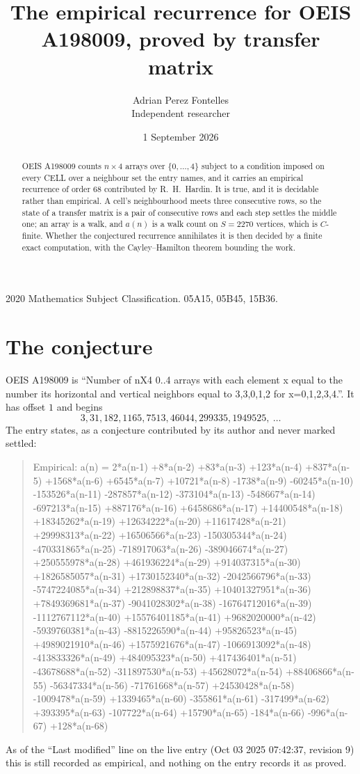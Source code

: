 \documentclass[11pt,a4paper]{article}
\title{The empirical recurrence for OEIS A198009, proved by transfer matrix}
\author{Adrian Perez Fontelles\\ \small Independent researcher}
\date{1 September 2026}
\theoremstyle{plain}
\theoremstyle{definition}
\begin{document}
\maketitle

\begin{abstract}
OEIS A198009 counts $n\times4$ arrays over $\{0,\dots,4\}$ subject to a condition imposed on
every CELL over a neighbour set the entry names, and it carries an empirical recurrence of
order $68$ contributed by R.~H.~Hardin. It is true, and it is decidable rather than
empirical. A cell's neighbourhood meets three consecutive rows, so the state of a transfer
matrix is a pair of consecutive rows and each step settles the middle one; an array is a
walk, and $a(n)$ is a walk count on $S=2270$ vertices, which is $C$-finite. Whether the
conjectured recurrence annihilates it is then decided by a finite exact computation, with the
Cayley--Hamilton theorem bounding the work.
\end{abstract}

\noindent\small 2020 Mathematics Subject Classification. 05A15, 05B45, 15B36.\normalsize

\section{The conjecture}

OEIS A198009 is ``Number of nX4 0..4 arrays with each element x equal to the number its horizontal and vertical neighbors equal to 3,3,0,1,2 for x=0,1,2,3,4.''. It has offset $1$ and begins
\[
3, 31, 182, 1165, 7513, 46044, 299335, 1949525,\ \dots
\]
The entry states, as a conjecture contributed by its author and never marked settled:
\begin{quote}
Empirical: a(n) = 2*a(n-1) +8*a(n-2) +83*a(n-3) +123*a(n-4) +837*a(n-5) +1568*a(n-6) +6545*a(n-7) +10721*a(n-8) -1738*a(n-9) -60245*a(n-10) -153526*a(n-11) -287857*a(n-12) -373104*a(n-13) -548667*a(n-14) -697213*a(n-15) +887176*a(n-16) +6458686*a(n-17) +14400548*a(n-18) +18345262*a(n-19) +12634222*a(n-20) +11617428*a(n-21) +29998313*a(n-22) +16506566*a(n-23) -150305344*a(n-24) -470331865*a(n-25) -718917063*a(n-26) -389046674*a(n-27) +250555978*a(n-28) +461936224*a(n-29) +914037315*a(n-30) +1826585057*a(n-31) +1730152340*a(n-32) -2042566796*a(n-33) -5747224085*a(n-34) +212898837*a(n-35) +10401327951*a(n-36) +7849369681*a(n-37) -9041028302*a(n-38) -16764712016*a(n-39) -1112767112*a(n-40) +15576401185*a(n-41) +9682020000*a(n-42) -5939760381*a(n-43) -8815226590*a(n-44) +95826523*a(n-45) +4989021910*a(n-46) +1575921676*a(n-47) -1066913092*a(n-48) -413833326*a(n-49) +484095323*a(n-50) +417436401*a(n-51) -43678688*a(n-52) -311897530*a(n-53) +45628072*a(n-54) +88406866*a(n-55) -56347334*a(n-56) -71761668*a(n-57) +24530428*a(n-58) -1009478*a(n-59) +1339465*a(n-60) -355861*a(n-61) -317499*a(n-62) +393395*a(n-63) -107722*a(n-64) +15790*a(n-65) -184*a(n-66) -996*a(n-67) +128*a(n-68)
\end{quote}
As of the ``Last modified'' line on the live entry (Oct 03 2025 07:42:37, revision 9) this is still
recorded as empirical, and nothing on the entry records it as proved.
\end{document}
